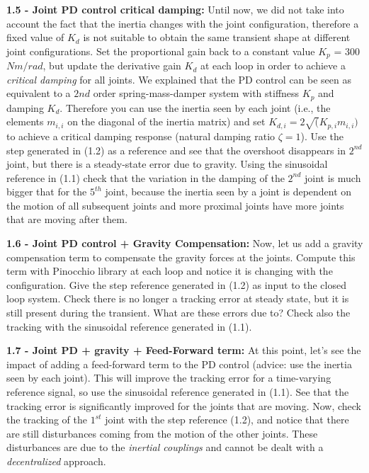 \documentclass[11pt]{article}
\begin{document}
\quad

\noindent
\textbf{1.5 - Joint PD control critical damping:}
Until now, we did not take into account the fact that the inertia changes with the joint configuration, therefore a fixed value of $K_d$ is not suitable to obtain 
the same transient shape at different joint configurations. Set the proportional gain back to a constant value $K_p$ = 300 $Nm/rad$, but update the derivative gain 
$K_d$ at each loop in order to achieve a \textit{critical damping} for all  joints. We explained that the PD control can be seen as equivalent to a $2{nd}$ order 
spring-mass-damper system with stiffness $K_p$ and damping $K_d$. 
Therefore you can use the inertia seen by each joint (i.e., the elements $m_{i,i}$ on the diagonal 
of the inertia matrix) and set $K_{d,i} = 2\sqrt(K_{p,i} m_{i,i})$ to achieve a critical damping response (natural damping ratio $\zeta = 1$). Use the step 
generated in (1.2) as a reference and see that the overshoot disappears in $2^{nd}$ joint, but there is a steady-state error due to gravity. Using the sinusoidal 
reference in (1.1) %
check that the variation in the damping of the $2^{nd}$ joint is much bigger that for the $5^{th}$ joint, because the inertia seen by a joint  is dependent on 
the motion of all subsequent joints and more proximal joints have more joints that are moving after them.

\quad

\noindent
\textbf{1.6 - Joint PD control + Gravity Compensation:}
Now, let us add a gravity compensation term to compensate the gravity forces at the joints. 
Compute this term with Pinocchio library at each loop and notice it is changing with the configuration. 
Give the step reference generated in (1.2) as input to the closed loop system. 
Check there is no longer a  tracking error at steady state, but it is still present during the transient. What are these errors due to?
Check also the tracking with the sinusoidal reference generated in (1.1).

\quad

\noindent
\textbf{1.7 - Joint  PD + gravity + Feed-Forward term:}
At this point, let's see the impact of adding a feed-forward term to the PD control (advice: use the inertia seen by each joint). This will improve the tracking error for a time-varying reference signal, so use the sinusoidal reference generated in (1.1). See that the tracking error is significantly improved for the joints that are moving. Now, check the tracking of the $1^{st}$ joint with the step reference (1.2), and notice that there are still disturbances coming from the motion of the other joints. These disturbances are  due to the \textit{inertial couplings} and cannot be dealt with a \textit{decentralized} approach.
\end{document}
